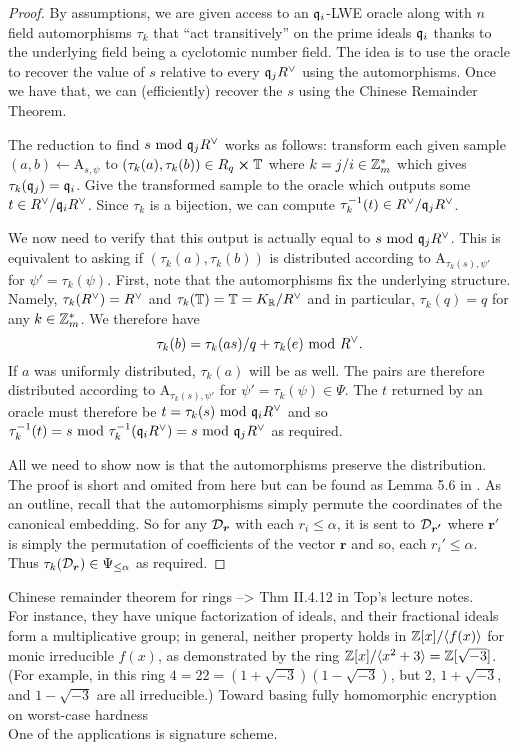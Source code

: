 \begin{proof}
	By assumptions, we are given access to an $\mathfrak{q}_i$-LWE oracle along with $n$ field automorphisms $\tau_k$ that ``act transitively'' on the prime ideals $\mathfrak{q}_i$ thanks to the underlying field being a cyclotomic number field. The idea is to use the oracle to recover the value of $s$ relative to every $\mathfrak{q}_jR^{\vee}$ using the automorphisms. Once we have that, we can (efficiently) recover the $s$ using the Chinese Remainder Theorem. 

	The reduction to find $s \text{ mod } \mathfrak{q}_j R^{\vee}$ works as follows: transform each given sample $(a,b) \leftarrow \text{A}_{s, \psi}$ to $(\tau_k(a), \tau_k(b)) \in R_q \cross \mathbb{T}$ where $k = j/i \in \mathbb{Z}^*_m$ which gives $\tau_k(\mathfrak{q}_j) = \mathfrak{q}_i$. Give the transformed sample to the oracle which outputs some $t \in R^{\vee} / \mathfrak{q}_i R^{\vee}$. Since $\tau_k$ is a bijection, we can compute $\tau^{-1}_k(t) \in R^{\vee} / \mathfrak{q}_j R^{\vee}$.

	We now need to verify that this output is actually equal to $s \text{ mod } \mathfrak{q}_j R^{\vee}$. This is equivalent to asking if $(\tau_k(a), \tau_k(b))$ is distributed according to A$_{\tau_k(s), \psi '}$ for $\psi ' = \tau_k(\psi)$. First, note that the automorphisms fix the underlying structure. Namely, $\tau_k(R^{\vee}) = R^{\vee}$ and $\tau_k(\mathbb{T}) = \mathbb{T} = K_{\mathbb{R}}/R^{\vee}$ and in particular, $\tau_k(q) = q$ for any $k \in \mathbb{Z}_m^*$. We therefore have
	\[ \tau_k(b) = \tau_k(as)/q + \tau_k(e) \text{ mod } R^{\vee}.\]
	If $a$ was uniformly distributed, $\tau_k(a)$ will be as well. The pairs are therefore distributed according to A$_{\tau_k(s), \psi '}$ for $\psi ' = \tau_k(\psi) \in \Psi$. The $t$ returned by an oracle must therefore be $t = \tau_k(s) \text{ mod } \mathfrak{q}_i R^{\vee}$ and so $\tau_k^{-1}(t) = s \text{ mod } \tau_k^{-1}(\mathfrak{q}_i R^{\vee}) = s \text{ mod } \mathfrak{q}_j R^{\vee}$ as required. 

	All we need to show now is that the automorphisms preserve the distribution. The proof is short and omited from here but can be found as Lemma 5.6 in \cite{ring-lwe}. As an outline, recall that the automorphisms simply permute the coordinates of the canonical embedding. So for any $\mathcal{D}_{\boldsymbol{r}}$ with each $r_i \leq \alpha$, it is sent to $\mathcal{D}_{\boldsymbol{r'}}$ where $\bm{r'}$ is simply the permutation of coefficients of the vector $\bm{r}$ and so, each $r_i' \leq \alpha$. Thus $\tau_k(\mathcal{D}_{\boldsymbol{r}}) \in \Psi_{\leq \alpha}$ as required.
\end{proof}


Chinese remainder theorem for rings --> Thm II.4.12 in Top's lecture notes. \\
For instance, they have unique factorization of ideals, and their fractional ideals form a multiplicative group; in general, neither property holds in $\mathbb{Z}[x]/\langle f (x) \rangle$ for monic irreducible $f (x)$, as demonstrated by the ring $\mathbb{Z}[x]/\langle x^2+3 \rangle = \mathbb{Z}[\sqrt{-3}]$. (For example, in this ring $4 = 22 = (1+\sqrt{-3})(1 - \sqrt{-3})$, but 2, $1 + \sqrt{-3}$, and $1 - \sqrt{-3}$ are all irreducible.)
Toward basing fully homomorphic encryption on worst-case hardness \\
One of the applications is \cite{qTESLA} signature scheme.
